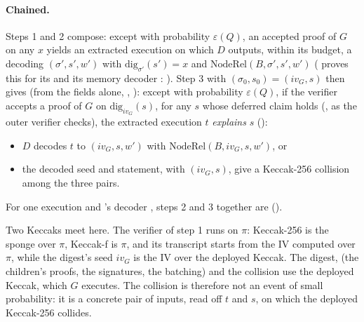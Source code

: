 \documentclass[11pt]{article}
\begin{document}
\paragraph{Chained.} Steps 1 and 2 compose: except with probability $\varepsilon(Q)$, an accepted
proof of $G$ on any $x$ yields an extracted execution on which $D$ outputs, within its budget, a
decoding $(\sigma', s', w')$ with $\mathrm{dig}_{\sigma'}(s') = x$ and
$\mathrm{NodeRel}(B, \sigma', s', w')$ ( proves this for its
 and its memory decoder : ). Step 3
with $(\sigma_0, s_0) = (iv_G, s)$ then gives  (from the fields alone,
, ): except with probability $\varepsilon(Q)$, if
the verifier accepts a proof of $G$ on $\mathrm{dig}_{iv_G}(s)$, for any $s$ whose deferred claim
holds (, as the outer verifier checks), the extracted execution $t$
\emph{explains} $s$
():
\begin{itemize}
\item $D$ decodes $t$ to $(iv_G, s, w')$ with $\mathrm{NodeRel}(B, iv_G, s, w')$, or
\item the decoded seed and statement, with $(iv_G, s)$, give a Keccak-256 collision among the
three pairs.
\end{itemize}
For one execution and 's decoder , steps 2 and 3 together are
 ().

Two Keccaks meet here. The verifier of step 1 runs on $\pi$: Keccak-256 is the sponge over $\pi$,
Keccak-f is $\pi$, and its transcript starts from the IV computed over $\pi$, while the digest's
seed $iv_G$ is the IV over the deployed Keccak. The digest,  (the children's proofs, the signatures, the
batching) and the collision use the deployed Keccak, which $G$ executes. The collision is therefore
not an event of small probability: it is a concrete pair of inputs, read off $t$ and $s$, on which
the deployed Keccak-256 collides.
\end{document}
